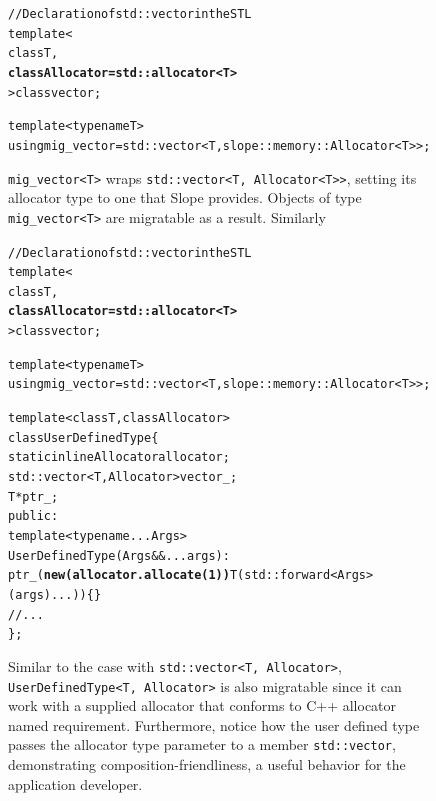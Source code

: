 \begin{figure}[t]
\begin{alltt}
// Declaration of std::vector in the STL
template<
    class T,
    \textbf{class Allocator = std::allocator<T>}
> class vector;

template<typename T>
using mig_vector = std::vector<T, slope::memory::Allocator<T>>;

\end{alltt}
\caption{
\texttt{mig\_vector<T>} wraps \texttt{std{::}vector<T, Allocator<T>>}, setting
its allocator type to one that Slope provides. Objects of type
\texttt{mig\_vector<T>} are migratable as a result. Similarly
}
\end{figure}





\begin{figure}[t]
\begin{alltt}
// Declaration of std::vector in the STL
template<
    class T,
    \textbf{class Allocator = std::allocator<T>}
> class vector;

template<typename T>
using mig_vector = std::vector<T, slope::memory::Allocator<T>>;

template<class T, class Allocator>
class UserDefinedType \{
  static inline Allocator allocator;
  std::vector<T, Allocator> vector_;
  T *ptr_;
 public:
  template<typename... Args>
  UserDefinedType(Args&&... args):
    ptr_(\textbf{new (allocator.allocate(1))} T(std::forward<Args>(args)...)) \{ \}
  // ...
\};

\end{alltt}
\caption{
Similar to the case with \texttt{std{::}vector<T, Allocator>},
\texttt{UserDefinedType<T, Allocator>} is also migratable since it can work
with a supplied allocator that conforms to C++ allocator named requirement.
Furthermore, notice how the user defined type passes the allocator type parameter
to a member \texttt{std{::}vector}, demonstrating composition-friendliness, a
useful behavior for the application developer.
}
\end{figure}


